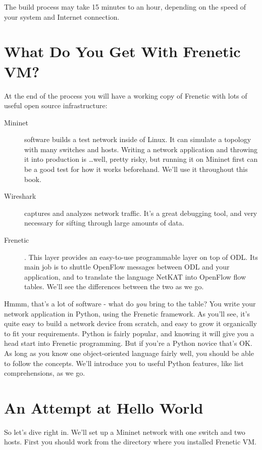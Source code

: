The build process may take 15 minutes to an hour, depending on the speed of your system and Internet connection. 

\section{What Do You Get With Frenetic VM?}

At the end of the process you will have a working copy of Frenetic with lots of useful open source infrastructure:

\begin{description}
\item[Mininet] software builds a test network inside of Linux.  
It can simulate a topology with many switches and hosts.  
Writing a network application and throwing it into production is \ldots well, pretty risky, but running it on Mininet first can be a good test for how it works beforehand.  
We'll use it throughout this book.  
\item[Wireshark] captures and analyzes network traffic.  
It's a great debugging tool, and very necessary for sifting through large amounts of data.
\item[Frenetic].  This layer provides an easy-to-use programmable layer on top of ODL.  Its main job is to shuttle OpenFlow messages between ODL and your application, and to translate the language NetKAT into OpenFlow flow tables.  We'll see the differences between the two as we go.
\end{description}

Hmmm, that's a lot of software - what do {\it you} bring to the table?  You write your network application in Python, using the Frenetic framework.  As you'll see, it's quite easy to build a network device from scratch, and easy to grow it organically to fit your requirements.  Python is fairly popular, and knowing it will give you  a head start into Frenetic programming.  But if you're a Python novice that's OK.  As long as you know one object-oriented language fairly well, you should be able to follow the concepts.  We'll introduce you to useful Python features, like list comprehensions, as we go.  

\section{An Attempt at Hello World}

So let's dive right in.  We'll set up a Mininet network with one switch and two hosts.  First you should work from the directory where you installed Frenetic VM.

